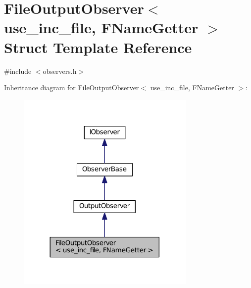 \hypertarget{struct_file_output_observer}{}\section{File\+Output\+Observer$<$ use\+\_\+inc\+\_\+file, F\+Name\+Getter $>$ Struct Template Reference}
\label{struct_file_output_observer}


{\ttfamily \#include $<$observers.\+h$>$}



Inheritance diagram for File\+Output\+Observer$<$ use\+\_\+inc\+\_\+file, F\+Name\+Getter $>$\+:
\nopagebreak
\begin{figure}[H]
\begin{center}
\leavevmode
\includegraphics[width=245pt]{struct_file_output_observer__inherit__graph}
\end{center}
\end{figure}


